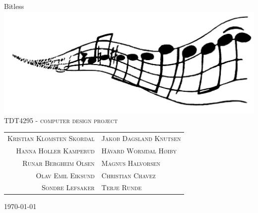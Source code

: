 \begin{titlepage}

\begin{center}


{\huge Bitless}\\[0.5cm]

    \includegraphics[scale=0.05]{./figures/logo}\\[2.5cm]


\textsc{\LARGE TDT4295 - computer design project}\\[2cm]


\begin{table}[h]
\centering
\begin{tabular}{rl}
    \textsc{Kristian Klomsten Skordal}  & \textsc{Jakob Dagsland Knutsen} \\
    \textsc{Hanna Holler Kamperud}      & \textsc{Håvard Wormdal Høiby} \\
    \textsc{Runar Bergheim Olsen}       & \textsc{Magnus Halvorsen}	\\
    \textsc{Olav Emil Eiksund}          & \textsc{Christian Chavez} \\
    \textsc{Sondre Lefsaker}            & \textsc{Terje Runde}
\end{tabular}
\end{table}

\vfill
\large{\today}

\end{center}

\end{titlepage}
